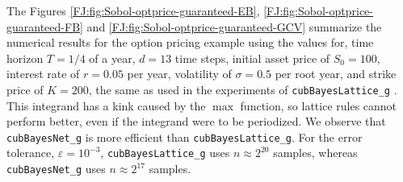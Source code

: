 \documentclass[graybox,footinfo]{svmult}
\begin{document}

The Figures \ref{FJ:fig:Sobol-optprice-guaranteed-EB}, \ref{FJ:fig:Sobol-optprice-guaranteed-FB} and 
\ref{FJ:fig:Sobol-optprice-guaranteed-GCV} summarize the numerical results for the option pricing example using the values for,
time horizon $T = 1/4$ of a year, $d = 13$ time steps, initial asset price of $S_0 = 100$, interest rate of $r =  0.05$ per year, volatility of $\sigma = 0.5$ per root year, and strike price of  $K = 200$, the same as used in the experiments of \texttt{cubBayesLattice\_g} \cite{RatHic19a}.
This integrand has a kink caused by the $\max$ function, so lattice rules cannot perform better, even if the integrand were to be periodized.  We observe that \texttt{cubBayesNet\_g} is more efficient than \texttt{cubBayesLattice\_g}.  For the error tolerance, $\varepsilon=10^{-3}$,  \texttt{cubBayesLattice\_g} uses $n \approx 2^{20}$ samples, whereas \texttt{cubBayesNet\_g} uses $n \approx 2^{17}$ samples.
\end{document}
